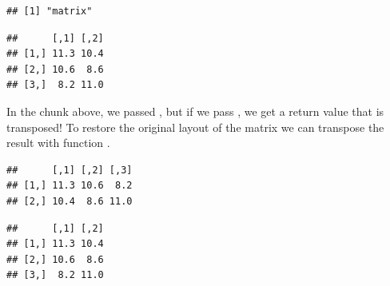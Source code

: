 \documentclass[krantz2]{krantz}\usepackage{knitr}
\begin{document}
\begin{knitrout}\footnotesize
{}\color{fgcolor}\begin{kframe}
\begin{alltt}
 \hlkwb{<-} \hlstd{(}
\end{alltt}
\end{kframe}
\end{knitrout}

\begin{knitrout}\footnotesize
{}\color{fgcolor}\begin{kframe}
\begin{alltt}
 \hlkwb{<-} \hlstd{(}   \hlstd{=} \hlstd{,}  
\end{alltt}
\begin{verbatim}
## [1] "matrix"
\end{verbatim}
\begin{alltt}
\end{alltt}
\begin{verbatim}
##      [,1] [,2]
## [1,] 11.3 10.4
## [2,] 10.6  8.6
## [3,]  8.2 11.0
\end{verbatim}
\end{kframe}
\end{knitrout}

In the chunk above, we passed , but if we pass , we get a return value that is transposed! To restore the original layout of the matrix we can transpose the result with function .

\begin{knitrout}\footnotesize
{}\color{fgcolor}\begin{kframe}
\begin{alltt}
 \hlkwb{<-} \hlstd{(}   \hlstd{=} \hlstd{,}  
\end{alltt}
\begin{verbatim}
##      [,1] [,2] [,3]
## [1,] 11.3 10.6  8.2
## [2,] 10.4  8.6 11.0
\end{verbatim}
\begin{alltt}
\end{alltt}
\begin{verbatim}
##      [,1] [,2]
## [1,] 11.3 10.4
## [2,] 10.6  8.6
## [3,]  8.2 11.0
\end{verbatim}
\end{kframe}
\end{knitrout}
\end{document}
